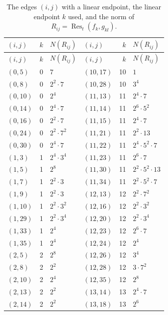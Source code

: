 \documentclass[11pt]{article}
\begin{document}
\begingroup\small
\setlength{\LTcapwidth}{\textwidth}
\begin{longtable}{@{}lrl@{\qquad}lrl@{}}
\caption{The edges $(i,j)$ with a linear endpoint, the linear endpoint $k$ used, and the norm of $R_{ij}=\operatorname{Res}_t(f_k,g_{kl})$.}\label{tab:sep}\\
\hline $(i,j)$ & $k$ & $N(R_{ij})$ & $(i,j)$ & $k$ & $N(R_{ij})$\\\hline\endfirsthead\hline $(i,j)$ & $k$ & $N(R_{ij})$ & $(i,j)$ & $k$ & $N(R_{ij})$\\\hline\endhead\hline\endfoot
$(0,5)$ & 0 & $7$ & $(10,17)$ & 10 & $1$\\
$(0,8)$ & 0 & $2^{2}\cdot 7$ & $(10,28)$ & 10 & $3^{4}$\\
$(0,10)$ & 0 & $2^{4}$ & $(11,13)$ & 11 & $2^{4}\cdot 7$\\
$(0,14)$ & 0 & $2^{4}\cdot 7$ & $(11,14)$ & 11 & $2^{6}\cdot 5^{2}$\\
$(0,16)$ & 0 & $2^{2}\cdot 7$ & $(11,15)$ & 11 & $2^{4}\cdot 7$\\
$(0,24)$ & 0 & $2^{2}\cdot 7^{2}$ & $(11,21)$ & 11 & $2^{2}\cdot 13$\\
$(0,30)$ & 0 & $2^{4}\cdot 7$ & $(11,22)$ & 11 & $2^{4}\cdot 5^{2}\cdot 7$\\
$(1,3)$ & 1 & $2^{4}\cdot 3^{4}$ & $(11,23)$ & 11 & $2^{6}\cdot 7$\\
$(1,5)$ & 1 & $2^{8}$ & $(11,30)$ & 11 & $2^{2}\cdot 5^{2}\cdot 13$\\
$(1,7)$ & 1 & $2^{2}\cdot 3$ & $(11,34)$ & 11 & $2^{2}\cdot 5^{2}\cdot 7$\\
$(1,9)$ & 1 & $2^{2}\cdot 3$ & $(12,13)$ & 12 & $2^{2}\cdot 7^{2}$\\
$(1,10)$ & 1 & $2^{2}\cdot 3^{2}$ & $(12,16)$ & 12 & $2^{2}\cdot 3^{2}$\\
$(1,29)$ & 1 & $2^{2}\cdot 3^{4}$ & $(12,20)$ & 12 & $2^{2}\cdot 3^{4}$\\
$(1,33)$ & 1 & $2^{4}$ & $(12,23)$ & 12 & $2^{6}\cdot 7$\\
$(1,35)$ & 1 & $2^{4}$ & $(12,24)$ & 12 & $2^{4}$\\
$(2,5)$ & 2 & $2^{8}$ & $(12,26)$ & 12 & $3^{4}$\\
$(2,8)$ & 2 & $2^{2}$ & $(12,28)$ & 12 & $3\cdot 7^{2}$\\
$(2,10)$ & 2 & $2^{4}$ & $(12,35)$ & 12 & $2^{8}$\\
$(2,13)$ & 2 & $2^{2}$ & $(13,14)$ & 13 & $2^{4}\cdot 7$\\
$(2,14)$ & 2 & $2^{2}$ & $(13,18)$ & 13 & $2^{6}$\\

\end{longtable}
\end{document}
